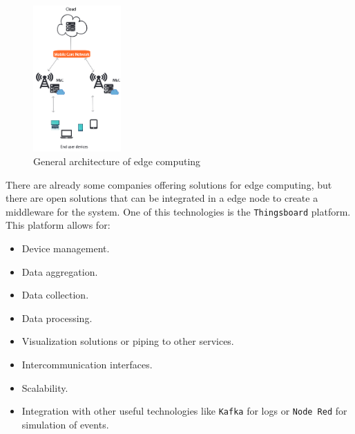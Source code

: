 \begin{figure}[H]
    \centering
    \includegraphics[width=0.3\textwidth]{./images/4/MEC.png}
    \caption{General architecture of edge computing\cite{MobileEdgeComputing}}
    \label{fig:mec}
\end{figure}

There are already some companies offering  solutions for edge computing, but there are open solutions that can be integrated in a edge node to create a middleware for the system. One of this 
technologies is the \texttt{Thingsboard} platform. This platform allows for:
\begin{itemize}
    \item Device management.
    \item Data aggregation.
    \item Data collection.
    \item Data processing.
    \item Visualization solutions or piping to other services.
    \item Intercommunication interfaces.
    \item Scalability.
    \item Integration with other useful technologies like \texttt{Kafka} for logs or \texttt{Node Red} for simulation of events.
\end{itemize}

